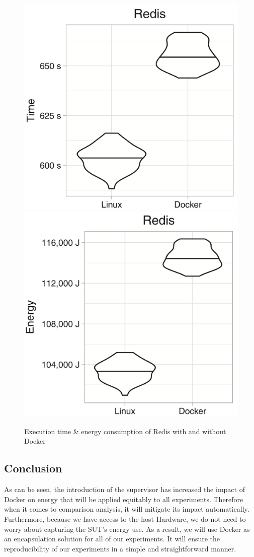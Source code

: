 \begin{figure}[!bht]
    \includegraphics[width=.5\linewidth]{imgs/docker_vs_vm_energy_paper/reddis_time}
    \includegraphics[width=.5\linewidth]{imgs/docker_vs_vm_energy_paper/reddis_energy}
    \caption{Execution time \& energy consumption of Redis with and without Docker~\cite{santos2018does}}\label{fig:docker_reddis}
\end{figure}


\subsection{Conclusion}
As can be seen, the introduction of the supervisor has increased the impact of Docker on energy that will be applied equitably to all experiments.
Therefore when it comes to comparison analysis, it will mitigate its impact automatically.
Furthermore, because we have access to the host Hardware, we do not need to worry about capturing the SUT's energy use.
As a result, we will use Docker as an encapsulation solution for all of our experiments.
It will ensure the reproducibility of our experiments in a simple and straightforward manner.
\clearpage